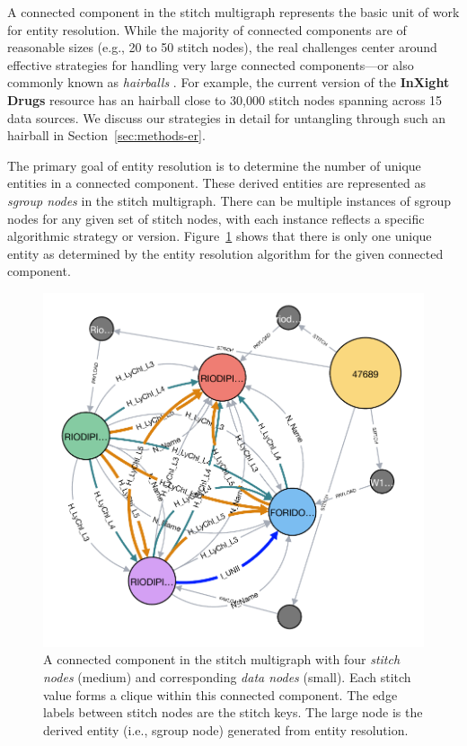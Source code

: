 \documentclass{bioinfo}
\newcommand\ix{\textbf{InXight Drugs}}
\begin{document}
A connected component in the stitch multigraph represents the basic
unit of work for entity resolution. While the majority of connected
components are of reasonable sizes (e.g., 20 to 50 stitch nodes), the
real challenges center around effective strategies for handling very
large connected components---or also commonly known
as \emph{hairballs} \citep{Croset2015}. For example, the current
version of the \ix{} resource has an hairball close to 30,000 stitch
nodes spanning across 15 data sources. We discuss our strategies in
detail for untangling through such an hairball in
Section~\ref{sec:methods-er}. 

The primary goal of entity resolution is to determine the number of
unique entities in a connected component. These derived entities are
represented as \emph{sgroup nodes} in the stitch multigraph. There can
be multiple instances of sgroup nodes for any given set of stitch
nodes, with each instance reflects a specific algorithmic strategy or
version. Figure~\ref{fig:graph1} shows that there is only one unique
entity as determined by the entity resolution algorithm for the given
connected component. 

\begin{figure}[!tpb]
\centerline{\includegraphics[scale=0.5]{graph3}}
\caption{A connected component in the stitch multigraph with
four \emph{stitch nodes} (medium) and corresponding \emph{data nodes}
(small). Each stitch value forms a clique within this connected
component. The edge labels between stitch nodes are the stitch keys.
The large node is the derived entity (i.e., sgroup node) generated
from entity resolution.}\label{fig:graph1} 
\end{figure}
\end{document}
